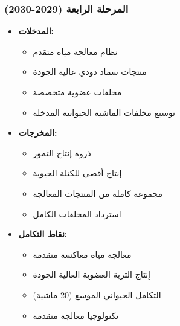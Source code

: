 \subsubsection{المرحلة الرابعة (2029-2030)}
\begin{itemize}
    \item \textbf{المدخلات:}
    \begin{itemize}
        \item نظام معالجة مياه متقدم
        \item منتجات سماد دودي عالية الجودة
        \item مخلفات عضوية متخصصة
        \item توسيع مخلفات الماشية الحيوانية المدخلة
    \end{itemize}
    \item \textbf{المخرجات:}
    \begin{itemize}
        \item ذروة إنتاج التمور
        \item إنتاج أقصى للكتلة الحيوية
        \item مجموعة كاملة من المنتجات المعالجة
        \item استرداد المخلفات الكامل
    \end{itemize}
    \item \textbf{نقاط التكامل:}
    \begin{itemize}
        \item معالجة مياه معاكسة متقدمة
        \item إنتاج التربة العضوية العالية الجودة
        \item التكامل الحيواني الموسع (20 ماشية)
        \item تكنولوجيا معالجة متقدمة
    \end{itemize}
\end{itemize}

